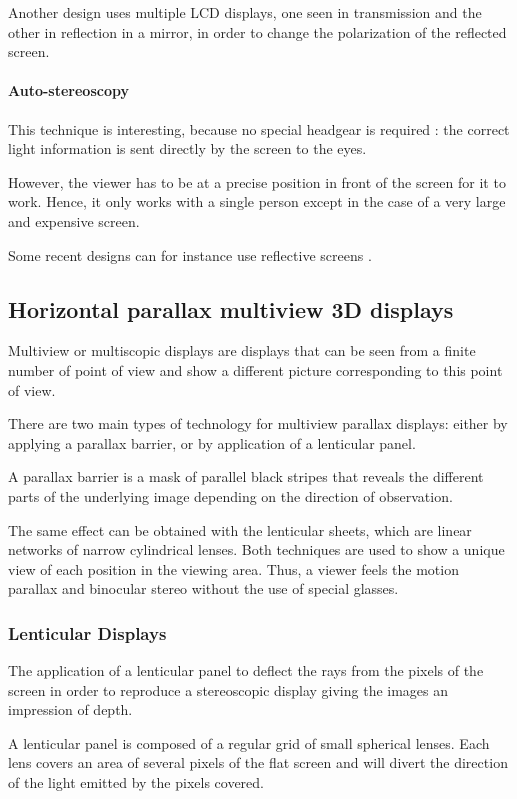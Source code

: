 Another design uses multiple LCD displays, one seen in transmission and the other in reflection in a mirror, in order to change the polarization of the reflected screen.

\paragraph{Auto-stereoscopy}
This technique is interesting, because no special headgear is required : the correct light information is sent directly by the screen to the eyes.

However, the viewer has to be at a precise position in front of the screen for it to work. Hence, it only works with a single person except in the case of a very large and expensive screen.

Some recent designs can for instance use reflective screens \cite{smithwick2013autostereoscopic}.

\subsection{Horizontal parallax multiview 3D displays}
Multiview or multiscopic displays are displays that can be seen from a finite number of point of view and show a different picture corresponding to this point of view.

There are two main types of technology for multiview parallax displays: either by applying a parallax barrier, or by application of a lenticular panel.

A parallax barrier is a mask of parallel black stripes that reveals the different parts of the underlying image depending on the direction of observation.

The same effect can be obtained with the lenticular sheets, which are linear networks of narrow cylindrical lenses. Both techniques are used to show a unique view of each position in the viewing area. Thus, a viewer feels the motion parallax and binocular stereo without the use of special glasses. 

\subsubsection{Lenticular Displays}
The application of a lenticular panel to deflect the rays from the pixels of the screen in order to reproduce a stereoscopic display giving the images an impression of depth.

A lenticular panel is composed of a regular grid of small spherical lenses. Each lens covers an area of several pixels of the flat screen and will divert the direction of the light emitted by the pixels covered.

